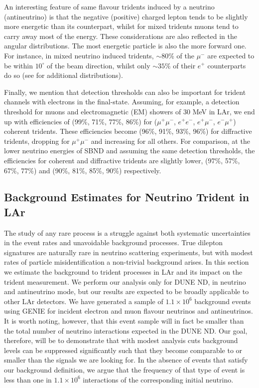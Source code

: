 An interesting feature of same flavour tridents induced by a neutrino (antineutrino) is that the negative (positive) charged lepton tends to be slightly more energetic than its counterpart, whilst for mixed tridents muons tend to carry away most of the energy. These considerations are also reflected in the angular distributions. The most energetic particle is also the more forward one. For instance, in mixed neutrino induced tridents, $\sim 80 \%$ of the $\mu^-$ are expected to be within $10^\circ$ of the beam direction, whilst only $\sim 35 \%$ of their $e^+$ counterparts do so (see  for additional distributions).


Finally, we mention that detection thresholds can also be important for trident channels with electrons in the final-state. Assuming, for example, a detection threshold for muons and electromagnetic (EM) showers of 30 MeV in LAr, we end up with efficiencies of (99\%, 71\%, 77\%, 86\%) for ($\mu^+ \mu^-$, $e^+ e^-$, $e^+ \mu^-$, $e^- \mu^+$) coherent tridents. These efficiencies become (96\%, 91\%, 93\%, 96\%) for diffractive tridents, dropping for $\mu^+\mu^-$ and increasing for all others. For comparison, at the lower neutrino energies of SBND and assuming the same detection thresholds, the efficiencies for coherent and diffractive tridents are slightly lower, (97\%, 57\%, 67\%, 77\%) and (90\%, 81\%, 85\%, 90\%) respectively.

\subsection{Background Estimates for Neutrino Trident in LAr}
\label{subsec:bck}

The study of any rare process is a struggle against both systematic uncertainties in the event rates and unavoidable background processes. True dilepton signatures are naturally rare in neutrino scattering experiments, but with modest rates of particle misidentification a non-trivial background arises. In this section we estimate the background to trident processes in LAr and its impact on the trident measurement. We perform our analysis only for DUNE ND, in neutrino and antineutrino mode, but our results are expected to be broadly applicable to other LAr detectors. We have generated a sample of $1.1 \times 10^6$ background events using GENIE \cite{Andreopoulos2009} for incident electron and muon flavour neutrinos and antineutrinos. It is worth noting, however, that this event sample will in fact be smaller than the total number of neutrino interactions expected in the DUNE ND. 
%
Our goal, therefore, will be to demonstrate that with modest analysis cuts background levels can be suppressed significantly such that they become comparable to or smaller than the signals we are looking for. In the absence of events that satisfy our background definition, we argue that the frequency of that type of event is less than one in $1.1\times 10^6$ interactions of the corresponding initial neutrino.  

